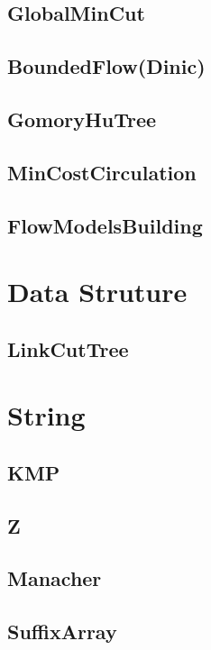 	\subsection{GlobalMinCut}
	
	\subsection{BoundedFlow(Dinic)}
	
	\subsection{GomoryHuTree}
	
	\subsection{MinCostCirculation}
	
	\subsection{FlowModelsBuilding}
	
\section{Data Struture}
	\subsection{LinkCutTree}
	
\section{String}
	\subsection{KMP}
	
	\subsection{Z}
	
	\subsection{Manacher}
	
	\subsection{SuffixArray}
	
